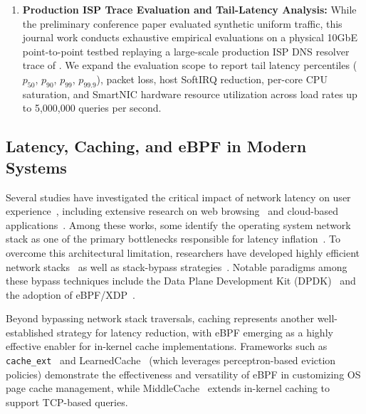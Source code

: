 \documentclass[a4paper,fleqn,colorlinks,hidelinks]{cas-sc}
\begin{document}
\begin{enumerate}
    \item \textbf{Production ISP Trace Evaluation and Tail-Latency Analysis:} While the preliminary conference paper evaluated synthetic uniform traffic, this journal work conducts exhaustive empirical evaluations on a physical 10GbE point-to-point testbed replaying a large-scale production ISP DNS resolver trace of \citet{11314363}. We expand the evaluation scope to report tail latency percentiles ($p_{50}$, $p_{90}$, $p_{99}$, $p_{99.9}$), packet loss, host SoftIRQ reduction, per-core CPU saturation, and SmartNIC hardware resource utilization across load rates up to 5,000,000 queries per second.
\end{enumerate}

\subsection{Latency, Caching, and eBPF in Modern Systems}
\label{sec:background_latency_caching}

Several studies have investigated the critical impact of network latency on user experience~\citep{attig2017system}, including extensive research on web browsing~\citep{arapakis2021impact} and cloud-based applications~\citep{claypool2014effects}. Among these works, some identify the operating system network stack as one of the primary bottlenecks responsible for latency inflation~\citep{singla2014internet}. To overcome this architectural limitation, researchers have developed highly efficient network stacks~\citep{10.1145/2740070.2626311} as well as stack-bypass strategies~\citep{10.1145/3297156.3297242}. Notable paradigms among these bypass techniques include the Data Plane Development Kit (DPDK)~\citep{kourtis2015enhancing} and the adoption of eBPF/XDP~\citep{cai2021understanding}.

Beyond bypassing network stack traversals, caching represents another well-established strategy for latency reduction, with eBPF emerging as a highly effective enabler for in-kernel cache implementations. Frameworks such as \texttt{cache\_ext}~\citep{zussman2025cache_ext} and LearnedCache~\citep{qi2026learnedcache} (which leverages perceptron-based eviction policies) demonstrate the effectiveness and versatility of eBPF in customizing OS page cache management, while MiddleCache~\citep{pang2023middlecache} extends in-kernel caching to support TCP-based queries.
\end{document}
